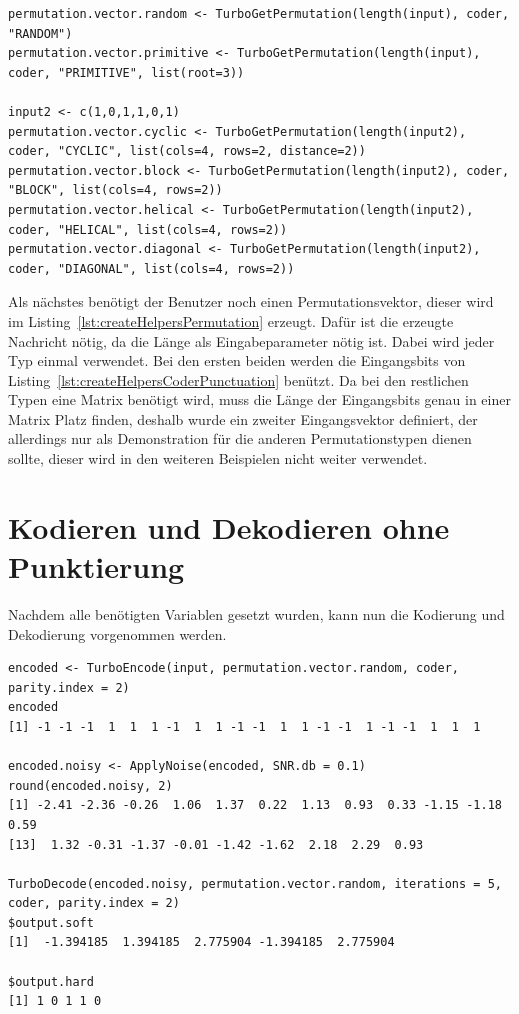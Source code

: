 \begin{lstlisting}[caption=Erzeugung von verschiedenen Permutationsvektoren, label={lst:createHelpersPermutation}, float=!th]
permutation.vector.random <- TurboGetPermutation(length(input), coder, "RANDOM")
permutation.vector.primitive <- TurboGetPermutation(length(input), coder, "PRIMITIVE", list(root=3))

input2 <- c(1,0,1,1,0,1)
permutation.vector.cyclic <- TurboGetPermutation(length(input2), coder, "CYCLIC", list(cols=4, rows=2, distance=2))
permutation.vector.block <- TurboGetPermutation(length(input2), coder, "BLOCK", list(cols=4, rows=2))
permutation.vector.helical <- TurboGetPermutation(length(input2), coder, "HELICAL", list(cols=4, rows=2))
permutation.vector.diagonal <- TurboGetPermutation(length(input2), coder, "DIAGONAL", list(cols=4, rows=2))
\end{lstlisting}

Als nächstes benötigt der Benutzer noch einen Permutationsvektor, dieser wird im Listing~\ref{lst:createHelpersPermutation} erzeugt. Dafür ist die erzeugte Nachricht nötig, da die Länge als Eingabeparameter nötig ist. Dabei wird jeder Typ einmal verwendet. Bei den ersten beiden werden die Eingangsbits von Listing~\ref{lst:createHelpersCoderPunctuation} benützt. Da bei den restlichen Typen eine Matrix benötigt wird, muss die Länge der Eingangsbits genau in einer Matrix Platz finden, deshalb wurde ein zweiter Eingangsvektor definiert, der allerdings nur als Demonstration für die anderen Permutationstypen dienen sollte, dieser wird in den weiteren Beispielen nicht weiter verwendet.

\FloatBarrier
\section{Kodieren und Dekodieren ohne Punktierung}
\label{sec:example_withoutPunctuation}
Nachdem alle benötigten Variablen gesetzt wurden, kann nun die Kodierung und Dekodierung vorgenommen werden.

\begin{lstlisting}[caption=Kodierung und Dekodierung ohne Punktierung, label={lst:encodeDecodeWithoutPunctuation}, float=!th]
encoded <- TurboEncode(input, permutation.vector.random, coder, parity.index = 2)
encoded
[1] -1 -1 -1  1  1  1 -1  1  1 -1 -1  1  1 -1 -1  1 -1 -1  1  1  1

encoded.noisy <- ApplyNoise(encoded, SNR.db = 0.1)
round(encoded.noisy, 2)
[1] -2.41 -2.36 -0.26  1.06  1.37  0.22  1.13  0.93  0.33 -1.15 -1.18  0.59
[13]  1.32 -0.31 -1.37 -0.01 -1.42 -1.62  2.18  2.29  0.93

TurboDecode(encoded.noisy, permutation.vector.random, iterations = 5, coder, parity.index = 2)
$output.soft
[1]  -1.394185  1.394185  2.775904 -1.394185  2.775904

$output.hard
[1] 1 0 1 1 0
\end{lstlisting}

